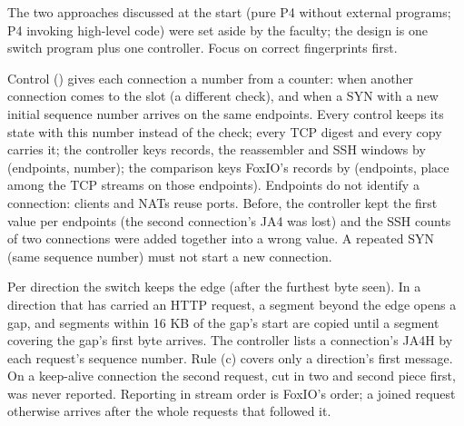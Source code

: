 {The two approaches discussed at the start (pure P4 without external programs; P4 invoking high-level code) were
set aside by the faculty; the design is one switch program plus one controller.}
{Focus on correct fingerprints first.}

{Control  () gives each connection a number from a counter: when another connection
comes to the slot (a different check), and when a SYN with a new initial sequence number arrives on the same
endpoints. Every control keeps its state with this number instead of the check; every TCP digest and every copy
carries it; the controller keys records, the reassembler and SSH windows by (endpoints, number); the comparison keys
FoxIO's records by (endpoints, place among the TCP streams on those endpoints).}
{Endpoints do not identify a connection: clients and NATs reuse ports. Before, the controller kept the first value
per endpoints (the second connection's JA4 was lost) and the SSH counts of two connections were added together into
a wrong value. A repeated SYN (same sequence number) must not start a new connection.}

{Per direction the switch keeps the edge (after the furthest byte seen). In a direction that has carried an HTTP
request, a segment beyond the edge opens a gap, and segments within 16 KB of the gap's start are copied until a
segment covering the gap's first byte arrives. The controller lists a connection's JA4H by each request's sequence
number.}
{Rule (c) covers only a direction's first message. On a keep-alive connection the second request, cut in two and
second piece first, was never reported. Reporting in stream order is FoxIO's order; a joined request otherwise
arrives after the whole requests that followed it.}

